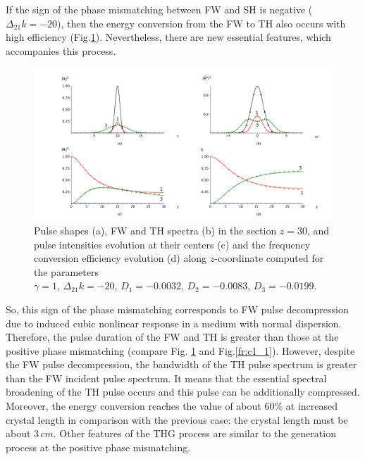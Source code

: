 \documentclass[a4paper, 12pt, onecolumn]{extarticle}
\begin{document}
If the sign of the phase mismatching between FW and SH is negative (\(\Delta_{21}k=-20\)), then the energy conversion from the FW to TH also occurs with high efficiency (Fig.\ref{fr:c1_2}). Nevertheless, there are new essential features, which accompanies this process. 
\begin{figure}[h!] 
\centering 
\includegraphics[width=0.9\linewidth]{Cascade1_2}  
\caption{Pulse shapes (a), FW and TH spectra (b) in the section \(z=30\), and pulse intensities evolution at their centers (c) and the frequency conversion efficiency evolution (d) along \(z\)-coordinate computed for the parameters $\gamma=1,\, \Delta_{21} k=-20,\, D_1=-0.0032,\, D_2=-0.0083,\, D_3=-0.0199.$} 
\label{fr:c1_2}
\end{figure}
So, this sign of the phase mismatching corresponds to FW pulse decompression due to induced cubic nonlinear response in a medium with normal dispersion. Therefore, the pulse duration of the FW and TH is greater than those at the positive phase mismatching (compare Fig. \ref{fr:c1_2} and Fig.\ref{fr:c1_1}). However, despite the FW pulse decompression, the bandwidth of the TH pulse spectrum is greater than the FW incident pulse spectrum. It means that the essential spectral broadening of the TH pulse occurs and this pulse can be additionally compressed. Moreover, the energy conversion reaches the value of about \(60\%\) at increased crystal length in comparison with the previous case: the crystal length must be about \(3\,cm\). Other features of the THG process are similar to the generation process at the positive phase mismatching.
\end{document}
